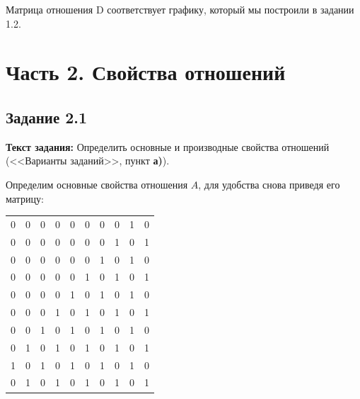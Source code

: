 \documentclass[12pt]{article}
\begin{document}
	\begin{figure}[h]
		\noindent{}
	\end{figure}
	
	Матрица отношения D соответствует графику, который мы построили в задании 1.2.
	\newpage
	
	\section{Часть 2. Свойства отношений}
	\subsection{Задание 2.1}
	\label{subpart2_1}
	{\bf Текст задания:} Определить основные и производные свойства отношений (<<Варианты заданий>>, пункт {\bf а)}).
	
	Определим основные свойства отношения $A$, для удобства снова приведя его матрицу: 

	\begin{tabular} {c c c c c c c c c c}
		0 & 0 & 0 & 0 & 0 & 0 & 0 & 0 & 1 & 0 \\
		0 & 0 & 0 & 0 & 0 & 0 & 0 & 1 & 0 & 1 \\
		0 & 0 & 0 & 0 & 0 & 0 & 1 & 0 & 1 & 0 \\
		0 & 0 & 0 & 0 & 0 & 1 & 0 & 1 & 0 & 1 \\
		0 & 0 & 0 & 0 & 1 & 0 & 1 & 0 & 1 & 0 \\
		0 & 0 & 0 & 1 & 0 & 1 & 0 & 1 & 0 & 1 \\
		0 & 0 & 1 & 0 & 1 & 0 & 1 & 0 & 1 & 0 \\
		0 & 1 & 0 & 1 & 0 & 1 & 0 & 1 & 0 & 1 \\
		1 & 0 & 1 & 0 & 1 & 0 & 1 & 0 & 1 & 0 \\
		0 & 1 & 0 & 1 & 0 & 1 & 0 & 1 & 0 & 1 \\
	\end{tabular}
	
\end{document}
